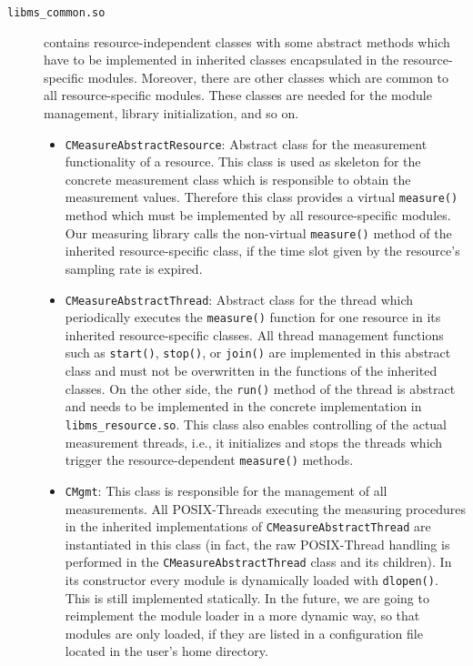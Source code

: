 \begin{description}
	
	\item[\texttt{libms\_common.so}] contains resource-independent classes with some abstract methods which have to be implemented in inherited classes encapsulated in the resource-specific modules. Moreover, there are other classes which are common to all resource-specific modules. These classes are needed for the module management, library initialization, and so on.

\pagebreak
\vspace*{-1.0cm}

	\begin{itemize}
		\item \texttt{CMeasureAbstractResource}: Abstract class for the measurement functionality of a resource. This class is used as skeleton for the concrete measurement class which is responsible to obtain the measurement values. Therefore this class provides a virtual \texttt{measure()} method which must be implemented by all resource-specific modules. Our measuring library calls the non-virtual \texttt{measure()} method of the inherited resource-specific class, if the time slot given by the resource's sampling rate is expired.
		
		\item \texttt{CMeasureAbstractThread}: Abstract class for the thread which periodically executes the \texttt{measure()} function for one resource in its inherited resource-specific classes. All thread management functions such as \texttt{start()}, \texttt{stop()}, or \texttt{join()} are implemented in this abstract class and must not be overwritten in the functions of the inherited classes.
		On the other side, the \texttt{run()} method of the thread is abstract and needs to be implemented in the concrete implementation in \texttt{libms\_resource.so}. This class also enables controlling of the actual measurement threads, i.e., it initializes and stops the threads which trigger the resource-dependent \texttt{measure()} methods.
		
		\item \texttt{CMgmt}: This class is responsible for the management of all measurements. All POSIX-Threads executing the measuring procedures in the inherited implementations of \texttt{CMeasureAbstractThread} are instantiated in this class (in fact, the raw POSIX-Thread handling is performed in the \texttt{CMeasureAbstractThread} class and its children). In its constructor every module is dynamically loaded with \texttt{dlopen()}. This is still implemented statically. In the future, we are going to reimplement the module loader in a more dynamic way, so that modules are only loaded, if they are listed in a configuration file located in the user's home directory.
		

\end{itemize}
\end{description}
